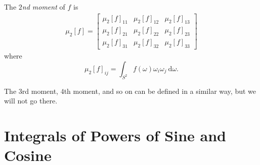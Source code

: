 \documentclass[10pt]{article}
\newcommand{\dee}{\mathrm{d}}
\begin{document}
\begin{itemize}
				The \emph{$2$nd moment} of $f$ is
				\begin{align*}
					\mu_2[f]
					= \begin{bmatrix}
						\mu_2[f]_{11} & \mu_2[f]_{12} & \mu_2[f]_{13} \\
						\mu_2[f]_{21} & \mu_2[f]_{22} & \mu_2[f]_{23} \\
						\mu_2[f]_{31} & \mu_2[f]_{32} & \mu_2[f]_{33} 
					\end{bmatrix}
				\end{align*}
				where $$\mu_2[f]_{ij} = \int_{S^2} f(\omega) \omega_i \omega_j\ \dee\omega.$$
				
				The $3$rd moment, $4$th moment, and so on can be defined in a similar way, but we will not go there.
		\end{itemize}
		
	\section{Integrals of Powers of Sine and Cosine} \label{sec:integrals_of_powers_of_sine_and_cosine} %
	
\end{document}
